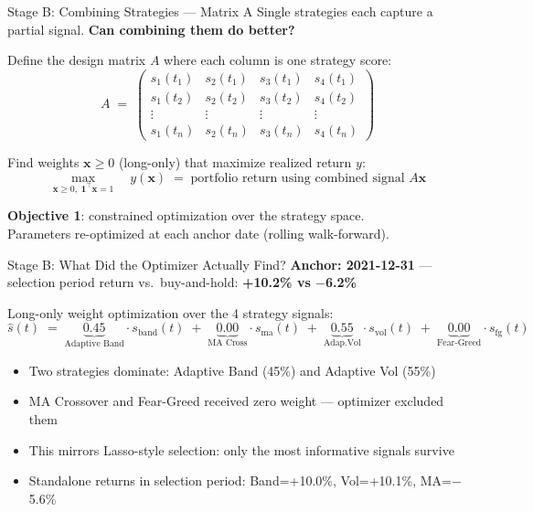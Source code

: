 \documentclass[aspectratio=169]{beamer}
\begin{document}
\begin{frame}{Stage B: Combining Strategies — Matrix A}
  Single strategies each capture a partial signal.
  \textbf{Can combining them do better?}

  \vspace{0.5em}
  Define the design matrix \(A\) where each column is one strategy score:
  \[
    A \;=\;
    \begin{pmatrix}
      s_1(t_1) & s_2(t_1) & s_3(t_1) & s_4(t_1) \\
      s_1(t_2) & s_2(t_2) & s_3(t_2) & s_4(t_2) \\
      \vdots   & \vdots   & \vdots   & \vdots   \\
      s_1(t_n) & s_2(t_n) & s_3(t_n) & s_4(t_n)
    \end{pmatrix}
  \]

  \vspace{0.3em}
  Find weights \(\mathbf{x} \geq 0\) (long-only) that maximize realized return \(y\):
  \[
    \max_{\mathbf{x} \geq 0,\; \mathbf{1}^\top \mathbf{x} = 1}
    \quad y(\mathbf{x}) \;=\; \text{portfolio return using combined signal } A\mathbf{x}
  \]

  \vspace{0.3em}
  \textbf{Objective 1}: constrained optimization over the strategy space.\\
  Parameters re-optimized at each anchor date (rolling walk-forward).
\end{frame}

\begin{frame}{Stage B: What Did the Optimizer Actually Find?}
  \textbf{Anchor: 2021-12-31} — selection period return vs.\ buy-and-hold: \textbf{+10.2\% vs $-$6.2\%}

  \vspace{0.4em}
  Long-only weight optimization over the 4 strategy signals:
  \[
    \hat{s}(t) \;=\; \underbrace{0.45}_{\text{Adaptive Band}} \cdot s_{\text{band}}(t)
              \;+\; \underbrace{0.00}_{\text{MA Cross}} \cdot s_{\text{ma}}(t)
              \;+\; \underbrace{0.55}_{\text{Adap.Vol}} \cdot s_{\text{vol}}(t)
              \;+\; \underbrace{0.00}_{\text{Fear-Greed}} \cdot s_{\text{fg}}(t)
  \]

  \vspace{0.4em}
  \begin{itemize}
    \item Two strategies dominate: Adaptive Band (45\%) and Adaptive Vol (55\%)
    \item MA Crossover and Fear-Greed received zero weight — optimizer excluded them
    \item This mirrors Lasso-style selection: only the most informative signals survive
    \item Standalone returns in selection period: Band=+10.0\%, Vol=+10.1\%, MA=$-$5.6\%
  \end{itemize}
\end{frame}
\end{document}
